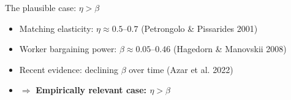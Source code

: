 \documentclass[9pt,xcolor={svgnames}]{beamer}
\begin{document}
\begin{frame}{The plausible case: $\eta > \beta$} \label{app:beta_eta}





\begin{itemize}
\footnotesize 
    \item Matching elasticity: $\eta \approx 0.5$--$0.7$ {\scriptsize (Petrongolo \& Pissarides 2001)}
    
    \item Worker bargaining power: $\beta \approx 0.05$--$0.46$ {\scriptsize (Hagedorn \& Manovskii 2008)}
    
    \item Recent evidence: declining $\beta$ over time {\scriptsize (Azar et al. 2022)}
    
    \item $\Rightarrow$ \textbf{Empirically relevant case: $\eta > \beta$}
\end{itemize}




    

\footnotesize 




  \hyperlink{main:beta_eta}{}


\end{frame}
\end{document}
